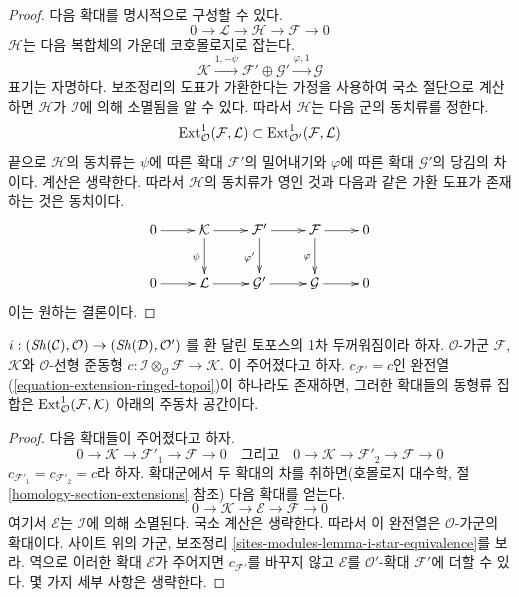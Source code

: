 \begin{proof}
다음 확대를 명시적으로 구성할 수 있다.
$$
0 \to \mathcal{L} \to \mathcal{H} \to \mathcal{F} \to 0
$$
$\mathcal{H}$는 다음 복합체의 가운데 코호몰로지로 잡는다.
$$
\mathcal{K}
\xrightarrow{1, - \psi}
\mathcal{F}' \oplus \mathcal{G}' \xrightarrow{\varphi, 1}
\mathcal{G}
$$
표기는 자명하다. 보조정리의 도표가 가환한다는 가정을 사용하여 국소
절단으로 계산하면 $\mathcal{H}$가 $\mathcal{I}$에 의해 소멸됨을 알 수
있다. 따라서 $\mathcal{H}$는 다음 군의 동치류를 정한다.
$$
\mathop{\mathrm{Ext}}\nolimits^1_\mathcal{O}(\mathcal{F}, \mathcal{L})
\subset
\mathop{\mathrm{Ext}}\nolimits^1_{\mathcal{O}'}(\mathcal{F}, \mathcal{L})
$$
끝으로 $\mathcal{H}$의 동치류는 $\psi$에 따른 확대 $\mathcal{F}'$의
밀어내기와 $\varphi$에 따른 확대 $\mathcal{G}'$의 당김의 차이다.
계산은 생략한다. 따라서 $\mathcal{H}$의 동치류가 영인 것과 다음과 같은
가환 도표가 존재하는 것은 동치이다.
$$
\xymatrix{
0 \ar[r] &
\mathcal{K} \ar[r] \ar[d]_{\psi} &
\mathcal{F}' \ar[r] \ar[d]_{\varphi'} &
\mathcal{F} \ar[r] \ar[d]_\varphi & 0\\
0 \ar[r] &
\mathcal{L} \ar[r] &
\mathcal{G}' \ar[r] &
\mathcal{G} \ar[r] & 0
}
$$
이는 원하는 결론이다.
\end{proof}

\begin{lemma}
\label{lemma-inf-ext-ringed-topoi}
$i : (\mathop{\mathit{Sh}}\nolimits(\mathcal{C}), \mathcal{O}) \to (\mathop{\mathit{Sh}}\nolimits(\mathcal{D}), \mathcal{O}')$
를 환 달린 토포스의 1차 두꺼워짐이라 하자. $\mathcal{O}$-가군
$\mathcal{F}$, $\mathcal{K}$와 $\mathcal{O}$-선형 준동형
$c : \mathcal{I} \otimes_\mathcal{O} \mathcal{F} \to \mathcal{K}$.
이 주어졌다고 하자. $c_{\mathcal{F}'} = c$인 완전열
(\ref{equation-extension-ringed-topoi})이 하나라도 존재하면, 그러한
확대들의 동형류 집합은
$\mathop{\mathrm{Ext}}\nolimits^1_\mathcal{O}(\mathcal{F}, \mathcal{K})$ 아래의 주동차 공간이다.
\end{lemma}

\begin{proof}
다음 확대들이 주어졌다고 하자.
$$
0 \to \mathcal{K} \to \mathcal{F}'_1 \to \mathcal{F} \to 0
\quad\text{그리고}\quad
0 \to \mathcal{K} \to \mathcal{F}'_2 \to \mathcal{F} \to 0
$$
$c_{\mathcal{F}'_1} = c_{\mathcal{F}'_2} = c$라 하자. 확대군에서 두
확대의 차를 취하면(호몰로지 대수학, 절
\ref{homology-section-extensions} 참조) 다음 확대를 얻는다.
$$
0 \to \mathcal{K} \to \mathcal{E} \to \mathcal{F} \to 0
$$
여기서 $\mathcal{E}$는 $\mathcal{I}$에 의해 소멸된다. 국소 계산은
생략한다. 따라서 이 완전열은 $\mathcal{O}$-가군의 확대이다. 사이트
위의 가군, 보조정리 \ref{sites-modules-lemma-i-star-equivalence}를 보라.
역으로 이러한 확대 $\mathcal{E}$가 주어지면
$c_{\mathcal{F}'}$를 바꾸지 않고 $\mathcal{E}$를
$\mathcal{O}'$-확대 $\mathcal{F}'$에 더할 수 있다. 몇 가지 세부 사항은
생략한다.
\end{proof}

